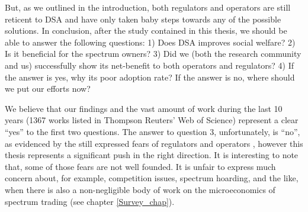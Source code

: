 But, as we outlined in the introduction, both regulators and operators are still reticent to DSA and have only taken baby steps towards any of the possible solutions. In conclusion, after the study contained in this thesis, we should be able to answer the following questions: 1) Does DSA improves social welfare? 2) Is it beneficial for the spectrum owners? 3) Did we (both the research community and us)  successfully show its net-benefit to both operators and regulators? 4) If the answer is yes, why its poor adoption rate? If the answer is no, where should we put our efforts now?

We believe that our findings and the vast amount of work during the last 10 years (1367 works listed in Thompson Reuters' Web of Science) represent a clear \enquote{yes} to the first two questions. The answer to question 3, unfortunately, is \enquote{no}, as evidenced by the still expressed fears of regulators and operators \cite{ref:Kelly2012}, however this thesis represents a significant push in the right direction. It is interesting to note that, some of those fears are not well founded. It is unfair to express much concern about, for example, competition issues, spectrum hoarding, and the like, when there is also a non-negligible body of work on the microeconomics of spectrum trading (see chapter \ref{Survey_chap}).

